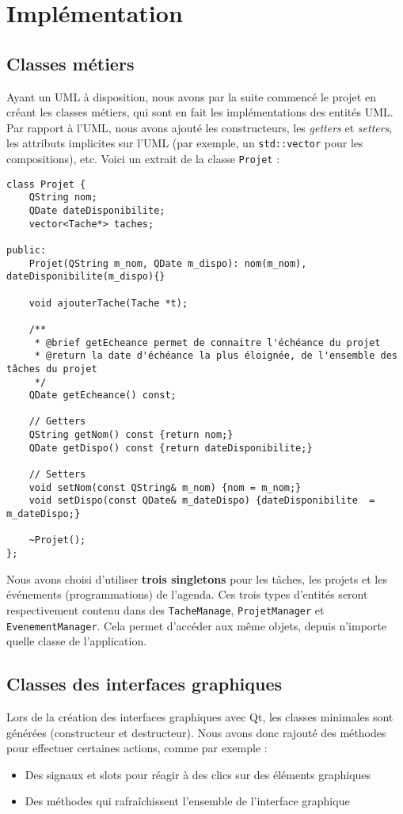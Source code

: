 \chapter{Implémentation}

\section{Classes métiers}

Ayant un UML à disposition, nous avons par la suite commencé le projet en créant les classes métiers, qui sont en fait les implémentations des entités UML. Par rapport à l'UML, nous avons ajouté les constructeurs, les \textit{getters} et \textit{setters}, les attributs implicites sur l'UML (par exemple, un \lstinline{std::vector} pour les compositions), etc. Voici un extrait de la classe \lstinline{Projet} :

\begin{lstlisting}
class Projet {
    QString nom;
    QDate dateDisponibilite;
    vector<Tache*> taches;

public:
    Projet(QString m_nom, QDate m_dispo): nom(m_nom), dateDisponibilite(m_dispo){}

    void ajouterTache(Tache *t);

    /**
     * @brief getEcheance permet de connaitre l'échéance du projet
     * @return la date d'échéance la plus éloignée, de l'ensemble des tâches du projet
     */
    QDate getEcheance() const;

    // Getters
    QString getNom() const {return nom;}
    QDate getDispo() const {return dateDisponibilite;}

    // Setters
    void setNom(const QString& m_nom) {nom = m_nom;}
    void setDispo(const QDate& m_dateDispo) {dateDisponibilite  = m_dateDispo;}

    ~Projet();
};
\end{lstlisting}

Nous avons choisi d'utiliser \textbf{trois singletons} pour les tâches, les projets et les événements (programmations) de l'agenda. Ces trois types d'entités seront respectivement contenu dans des \lstinline{TacheManage}, \lstinline{ProjetManager} et \lstinline{EvenementManager}. Cela permet d'accéder aux même objets, depuis n'importe quelle classe de l'application.

\section{Classes des interfaces graphiques}
Lors de la création des interfaces graphiques avec Qt, les classes minimales sont générées (constructeur et destructeur). Nous avons donc rajouté des méthodes pour effectuer certaines actions, comme par exemple :
\begin{itemize}
  \item Des signaux et slots pour réagir à des clics sur des éléments graphiques
  \item Des méthodes qui rafraîchissent l'ensemble de l'interface graphique
\end{itemize}

